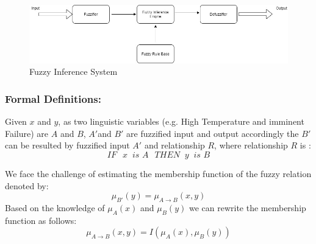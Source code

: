 \begin{figure}[H]
    \centering
    \includegraphics[width=14cm]{gfx/Fuzzy_Inference_System.png}
    \captionsetup{justification=centering}
    \caption{Fuzzy Inference System}
    \label{fig:Fuzzy Inference System}
\end{figure}

\subsubsection*{Formal Definitions:}
Given $x$ and $y$, as two linguistic variables (e.g. High Temperature and imminent Failure) are  $A$ and $B$, ${A}'$and ${B}'$ are fuzzified input and output accordingly the ${B}'$ can be resulted by fuzzified input ${A}'$ and relationship $R$, where relationship $R$ is \cite{Rutkowski2009}:
\begin{equation}
 IF\;\;\,  x\;\; is\,\, A\;\;\,  THEN\;\;  y\;\; is\,\, B   
\end{equation}

We face the challenge of estimating the membership function of the fuzzy relation denoted by:
\begin{equation}
    \mu _{{B}'}\left ( y \right )= \mu _{A\rightarrow B}\left ( x,y \right )
\end{equation}
Based on the knowledge of $\mu_{A}\left ( x \right )$ and  $\mu_{B}\left ( y \right )$ we can rewrite the membership function as follows:
\begin{equation}
    \mu _{A\rightarrow B}\left ( x,y \right )=I\left(\mu_{A}\left ( x \right ),\mu_{B}\left ( y \right ) \right)
\end{equation}

